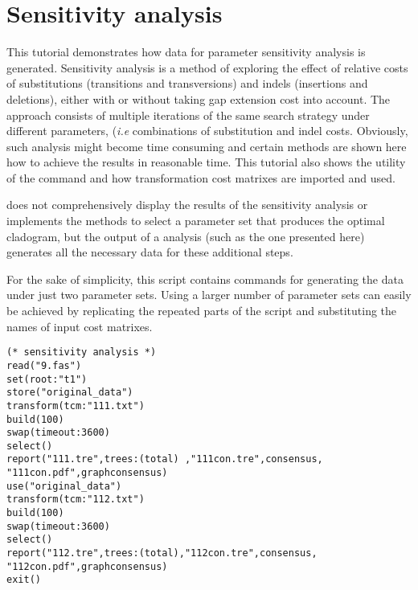 \section{Sensitivity analysis}{\label{tutorial4.5}}

This tutorial demonstrates how data for parameter sensitivity analysis is generated. Sensitivity analysis \cite{wheeler1995} is a method of exploring the effect of relative costs of substitutions (transitions and transversions) and indels (insertions and deletions), either with or without taking gap extension cost into account. The approach consists of multiple iterations of the same search strategy under different parameters, (\emph{i.e} combinations of substitution and indel costs. Obviously, such analysis might become time consuming and certain methods are shown here how to achieve the results in reasonable time. This tutorial also shows the utility of the command  and how transformation cost matrixes are imported and used.

\poy does not comprehensively display the results of the sensitivity analysis or implements the methods to select a parameter set that produces the optimal cladogram, but the output of a \poy analysis (such as the one presented here) generates all the necessary data for these additional steps.

For the sake of simplicity, this script contains commands for generating the data under just two parameter  sets. Using a larger number of parameter sets can easily be achieved by replicating the repeated parts of the script and substituting the names of input cost matrixes.

\begin{verbatim}
(* sensitivity analysis *)
read("9.fas")
set(root:"t1")
store("original_data")
transform(tcm:"111.txt")
build(100)
swap(timeout:3600)
select()
report("111.tre",trees:(total) ,"111con.tre",consensus,
"111con.pdf",graphconsensus)
use("original_data")
transform(tcm:"112.txt")
build(100)
swap(timeout:3600)
select()
report("112.tre",trees:(total),"112con.tre",consensus,
"112con.pdf",graphconsensus)
exit()
\end{verbatim}

